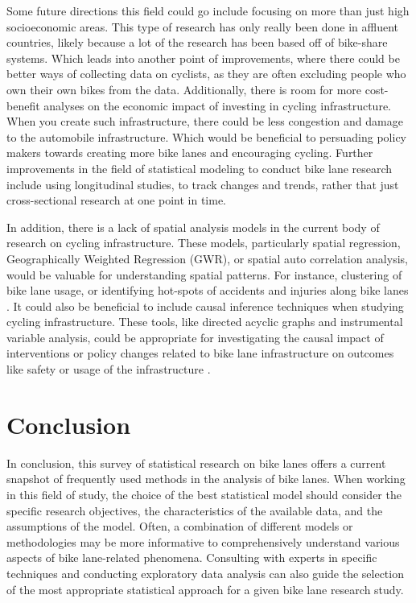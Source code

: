 \documentclass[12pt, letterpaper]{article}
\begin{document}
Some future directions this field could go include focusing on more than just high socioeconomic areas. This type of research has only really been done in affluent countries, likely because a lot of the research has been based off of bike-share systems. Which leads into another point of improvements, where there could be better ways of collecting data on cyclists, as they are often excluding people who own their own bikes from the data. Additionally, there is room for more cost-benefit analyses on the economic impact of investing in cycling infrastructure. When you create such infrastructure, there could be less congestion and damage to the automobile infrastructure. Which would be beneficial to persuading policy makers towards creating more bike lanes and encouraging cycling. Further improvements in the field of statistical modeling to conduct bike lane research include using longitudinal studies, to track changes and trends, rather that just cross-sectional research at one point in time. \par

In addition, there is a lack of spatial analysis models in the current body of research on cycling infrastructure. These models, particularly spatial regression, Geographically Weighted Regression (GWR), or spatial auto correlation analysis, would be valuable for understanding spatial patterns. For instance, clustering of bike lane usage, or identifying hot-spots of accidents and injuries along bike lanes \cite{Kanade_2022}. It could also be beneficial to include causal inference techniques when studying cycling infrastructure. These tools, like directed acyclic graphs and instrumental variable analysis, could be appropriate for investigating the causal impact of interventions or policy changes related to bike lane infrastructure on outcomes like safety or usage of the infrastructure \cite{Pearce_Lawlor_2016}. 

\section{Conclusion}
\label{sec:conc}

In conclusion, this survey of statistical research on bike lanes offers a current snapshot of frequently used methods in the analysis of bike lanes. When working in this field of study, the choice of the best statistical model should consider the specific research objectives, the characteristics of the available data, and the assumptions of the model. Often, a combination of different models or methodologies may be more informative to comprehensively understand various aspects of bike lane-related phenomena. Consulting with experts in specific techniques and conducting exploratory data analysis can also guide the selection of the most appropriate statistical approach for a given bike lane research study. \par
\end{document}
